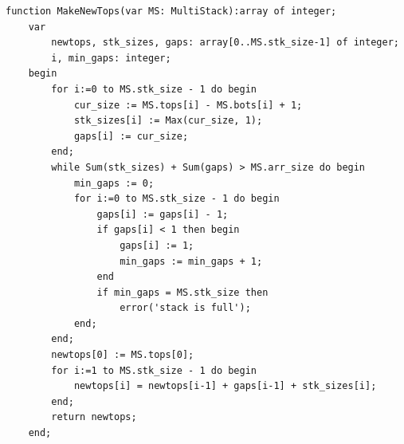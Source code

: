 \documentclass[12pt]{report}
\begin{document}
\begin{verbatim}
function MakeNewTops(var MS: MultiStack):array of integer;
    var
        newtops, stk_sizes, gaps: array[0..MS.stk_size-1] of integer;
        i, min_gaps: integer;
    begin
        for i:=0 to MS.stk_size - 1 do begin
            cur_size := MS.tops[i] - MS.bots[i] + 1;
            stk_sizes[i] := Max(cur_size, 1);
            gaps[i] := cur_size;
        end;
        while Sum(stk_sizes) + Sum(gaps) > MS.arr_size do begin
            min_gaps := 0;
            for i:=0 to MS.stk_size - 1 do begin
                gaps[i] := gaps[i] - 1;
                if gaps[i] < 1 then begin
                    gaps[i] := 1;
                    min_gaps := min_gaps + 1;
                end
                if min_gaps = MS.stk_size then
                    error('stack is full');
            end;
        end;
        newtops[0] := MS.tops[0];
        for i:=1 to MS.stk_size - 1 do begin
            newtops[i] = newtops[i-1] + gaps[i-1] + stk_sizes[i];
        end;
        return newtops;
    end;
\end{verbatim}
\end{document}
